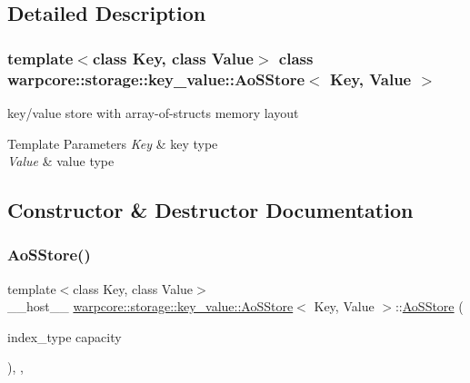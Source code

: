 \subsection{Detailed Description}
\subsubsection*{template$<$class Key, class Value$>$\newline
class warpcore\+::storage\+::key\+\_\+value\+::\+Ao\+S\+Store$<$ Key, Value $>$}

key/value store with array-\/of-\/structs memory layout 


\begin{DoxyTemplParams}{Template Parameters}
{\em Key} & key type \\
\hline
{\em Value} & value type \\
\hline
\end{DoxyTemplParams}


\subsection{Constructor \& Destructor Documentation}
\mbox{\label{classwarpcore_1_1storage_1_1key__value_1_1AoSStore_af99150a303902380688e35c914f01431}} 
\subsubsection{\texorpdfstring{Ao\+S\+Store()}{AoSStore()}\hspace{0.1cm}{\footnotesize\ttfamily [1/3]}}
{\footnotesize\ttfamily template$<$class Key, class Value$>$ \\
\+\_\+\+\_\+host\+\_\+\+\_\+ \hyperlink{classwarpcore_1_1storage_1_1key__value_1_1AoSStore}{warpcore\+::storage\+::key\+\_\+value\+::\+Ao\+S\+Store}$<$ Key, Value $>$\+::\hyperlink{classwarpcore_1_1storage_1_1key__value_1_1AoSStore}{Ao\+S\+Store} (\begin{DoxyParamCaption}\item[{index\+\_\+type}]{capacity }\end{DoxyParamCaption})\hspace{0.3cm}{\ttfamily [inline]}, {\ttfamily [explicit]}, {\ttfamily [noexcept]}}



